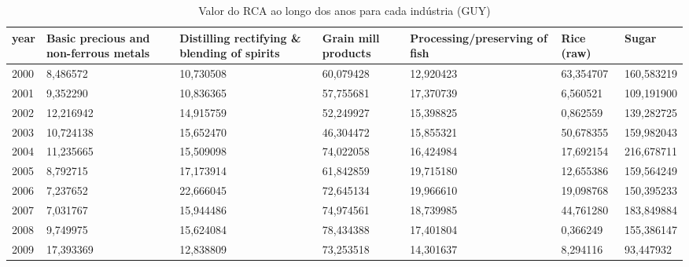 \begin{table}
\centering
\caption{Valor do RCA ao longo dos anos para cada indústria (GUY)}
\begin{tabular}{p{1cm}p{2cm}p{2cm}p{2cm}p{2cm}p{2cm}p{2cm}}
\toprule
 year &  Basic precious and non-ferrous metals &  Distilling rectifying \& blending of spirits &  Grain mill products &  Processing/preserving of fish &  Rice (raw) &      Sugar \\
\midrule
 2000 &                               8,486572 &                                    10,730508 &            60,079428 &                      12,920423 &   63,354707 & 160,583219 \\
 2001 &                               9,352290 &                                    10,836365 &            57,755681 &                      17,370739 &    6,560521 & 109,191900 \\
 2002 &                              12,216942 &                                    14,915759 &            52,249927 &                      15,398825 &    0,862559 & 139,282725 \\
 2003 &                              10,724138 &                                    15,652470 &            46,304472 &                      15,855321 &   50,678355 & 159,982043 \\
 2004 &                              11,235665 &                                    15,509098 &            74,022058 &                      16,424984 &   17,692154 & 216,678711 \\
 2005 &                               8,792715 &                                    17,173914 &            61,842859 &                      19,715180 &   12,655386 & 159,564249 \\
 2006 &                               7,237652 &                                    22,666045 &            72,645134 &                      19,966610 &   19,098768 & 150,395233 \\
 2007 &                               7,031767 &                                    15,944486 &            74,974561 &                      18,739985 &   44,761280 & 183,849884 \\
 2008 &                               9,749975 &                                    15,624084 &            78,434388 &                      17,401804 &    0,366249 & 155,386147 \\
 2009 &                              17,393369 &                                    12,838809 &            73,253518 &                      14,301637 &    8,294116 &  93,447932 \\

\end{tabular}
\end{table}
